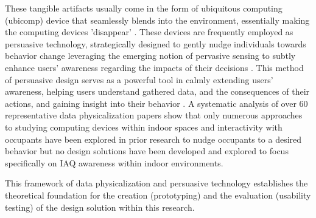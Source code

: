 These tangible artifacts usually come in the form of ubiquitous computing (ubicomp) \cite{bell_yesterdays_2007} device that seamlessly blends into the environment, essentially making the computing devices 'disappear' \cite{weiser_computer_1999}. These devices are frequently employed as persuasive technology, strategically designed to gently nudge individuals towards behavior change leveraging the emerging notion of pervasive sensing to subtly enhance users' awareness regarding the impacts of their decisions \cite{bader_windowwall_2019, rogers_ambient_2010}. This method of persuasive design serves as a powerful tool in calmly extending users' awareness, helping users understand gathered data, and the consequences of their actions, and gaining insight into their behavior \cite{bae_making_2022}. A systematic analysis of over 60 representative data physicalization papers \cite{sauve_physecology_2022} show that only numerous approaches to studying computing devices within indoor spaces and interactivity with occupants have been explored in prior research to nudge occupants to a desired behavior but no design solutions have been developed and explored to focus specifically on IAQ awareness within indoor environments. 

This framework of data physicalization and persuasive technology establishes the theoretical foundation for the creation (prototyping) and the evaluation (usability testing) of the design solution within this research.